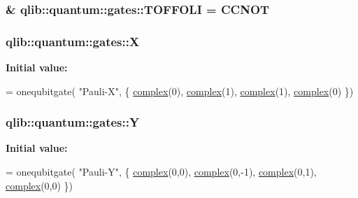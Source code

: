\subsubsection[{\texorpdfstring{T\+O\+F\+F\+O\+LI}{TOFFOLI}}]{\& qlib\+::quantum\+::gates\+::\+T\+O\+F\+F\+O\+LI = {\bf C\+C\+N\+OT}}\hypertarget{namespaceqlib_1_1quantum_1_1gates_a824d430d591160d7bd3237928d56570b}{}\label{namespaceqlib_1_1quantum_1_1gates_a824d430d591160d7bd3237928d56570b}
\subsubsection[{\texorpdfstring{X}{X}}]{ qlib\+::quantum\+::gates\+::X}\hypertarget{namespaceqlib_1_1quantum_1_1gates_af56c4617497a46f091c27f7f4bc65ed5}{}\label{namespaceqlib_1_1quantum_1_1gates_af56c4617497a46f091c27f7f4bc65ed5}
{\bfseries Initial value\+:}
\begin{DoxyCode}
= onequbitgate(
    \textcolor{stringliteral}{"Pauli-X"}, 
    \{
        \hyperlink{classqlib_1_1math_1_1complex}{complex}(0), \hyperlink{classqlib_1_1math_1_1complex}{complex}(1),
        \hyperlink{classqlib_1_1math_1_1complex}{complex}(1), \hyperlink{classqlib_1_1math_1_1complex}{complex}(0)
    \})
\end{DoxyCode}
\subsubsection[{\texorpdfstring{Y}{Y}}]{ qlib\+::quantum\+::gates\+::Y}\hypertarget{namespaceqlib_1_1quantum_1_1gates_a7d495b8ebaa4b3a3f73a871bc993e82b}{}\label{namespaceqlib_1_1quantum_1_1gates_a7d495b8ebaa4b3a3f73a871bc993e82b}
{\bfseries Initial value\+:}
\begin{DoxyCode}
= onequbitgate(
    \textcolor{stringliteral}{"Pauli-Y"}, 
    \{
        \hyperlink{classqlib_1_1math_1_1complex}{complex}(0,0), \hyperlink{classqlib_1_1math_1_1complex}{complex}(0,-1),
        \hyperlink{classqlib_1_1math_1_1complex}{complex}(0,1), \hyperlink{classqlib_1_1math_1_1complex}{complex}(0,0)
    \})
\end{DoxyCode}
